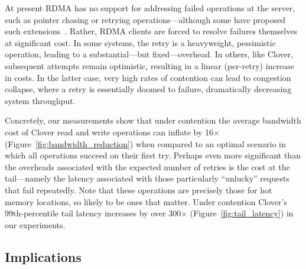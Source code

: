 At present RDMA has no support for addressing failed operations at the
server, such as pointer chasing or retrying operations---although some
have proposed such extensions~\cite{rma,snap,prism}.  Rather, RDMA
clients are forced to resolve failures themselves at significant cost.
In some
systems, the retry is a heavyweight, pessimistic operation, leading to
a substantial---but fixed---overhead.  In others, like Clover,
subsequent attempts remain optimistic, resulting in a linear
(per-retry) increase in costs.  In the latter case, very high
rates of contention can lead to congestion collapse, where a retry is
essentially doomed to failure, dramatically decreasing system
throughput.
%


Concretely,
our measurements show that under contention the
average bandwidth cost of Clover read and write operations can inflate
by 16$\times$ (Figure~\ref{fig:bandwidth_reduction}) when compared
to an optimal scenario in which all operations succeed on their first
try.
%
%
Perhaps even more significant than the overheads associated with the expected
number of retries is the cost at the tail---namely the latency associated with
those particularly ``unlucky'' requests that fail repeatedly.  Note that these
operations are precisely those for hot memory locations, so likely to be
ones that matter.  Under contention
Clover's 99th-percentile tail latency increases by
over 300$\times$ (Figure~\ref{fig:tail_latency}) in our experiments.



\subsection{Implications}

